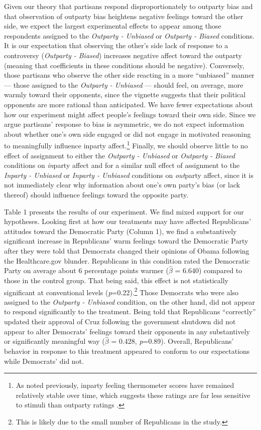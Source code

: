 \documentclass[12pt, letterpaper]{article}
\begin{document}
Given our theory that partisans respond disproportionately to outparty bias and that observation of outparty bias heightens negative feelings toward the other side, we expect the largest experimental effects to appear among those respondents assigned to the \textit{Outparty - Unbiased} or \textit{Outparty - Biased} conditions. It is our expectation that observing the other's side lack of response  to a controversy (\textit{Outparty - Biased}) increases negative affect toward the outparty (meaning that coefficients in these conditions should be negative). Conversely, those partisans who observe the other side reacting in a more ``unbiased'' manner --- those assigned to the \textit{Outparty - Unbiased} --- should feel, on average, more warmly toward their opponents, since the vignette suggests that their political opponents are more rational than anticipated. We have fewer expectations about how our experiment might affect people's feelings toward their own side. Since we argue partisans' response to bias is asymmetric, we do not expect information about whether one's own side engaged or did not engage in motivated reasoning to meaningfully influence inparty affect.\footnote{As noted previously, inparty feeling thermometer scores have remained relatively stable over time, which suggests these ratings are far less sensitive to stimuli than outparty ratings \citep{haidthetherington_2012, IyengarSoodLelkes2012}.} Finally, we should observe little to no effect of assignment to either the \textit{Outparty - Unbiased} or \textit{Outparty - Biased} conditions on \textit{in}party affect and for a similar null effect of assignment to the \textit{Inparty - Unbiased} or \textit{Inparty - Unbiased} conditions on \textit{out}party affect, since it is not immediately clear why information about one's own party's bias (or lack thereof) should influence feelings toward the opposite party. 

Table 1 presents the results of our experiment. We find mixed support for our hypotheses. Looking first at how our treatments may have affected Republicans' attitudes toward the Democratic Party (Column 1), we find a substantively significant increase in Republicans' warm feelings toward the Democratic Party after they were told that Democrats changed their opinions of Obama following the Healthcare.gov blunder. Republicans in this condition rated the Democratic Party on average about 6 percentage points warmer ($\hat{\beta}$ = 6.640) compared to those in the control group. That being said, this effect is not statistically significant at conventional levels (\textit{p}=0.22).\footnote{This is likely due to the small number of Republicans in the study.} Those Democrats who were also assigned to the \textit{Outparty - Unbiased} condition, on the other hand, did not appear to respond significantly to the treatment. Being told that Republicans  ``correctly'' updated their approval of Cruz following the government shutdown did not appear to alter Democrats' feelings toward their opponents in any substantively or significantly meaningful way ($\hat{\beta}$ = 0.428, \textit{p}=0.89). Overall, Republicans' behavior in response to this treatment appeared to conform to our expectations while Democrats' did not.
\end{document}
